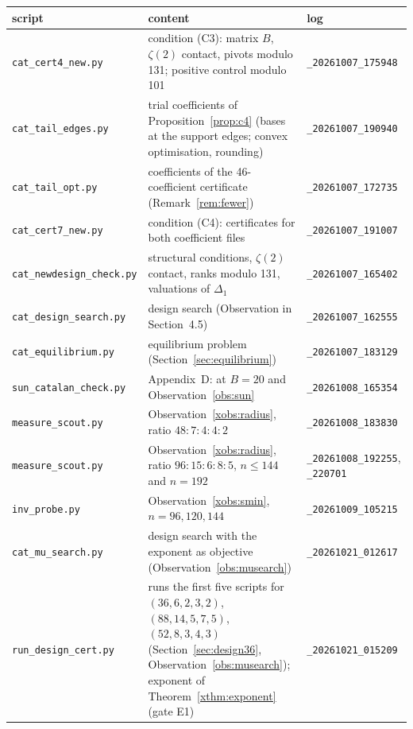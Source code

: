 \documentclass[11pt]{article}
\theoremstyle{definition}
\begin{document}
\begin{center}
\small
\begin{tabular}{p{4.2cm}p{7.2cm}p{3.6cm}}
\toprule
script & content & log\\
\midrule
\texttt{cat\_cert4\_new.py} & condition (C3): matrix $B$, $\zeta(2)$ contact, pivots modulo 131; positive control \cite[Table~1]{OAI} modulo 101 & \texttt{\_20261007\_175948}\\
\texttt{cat\_tail\_edges.py} & trial coefficients of Proposition~\ref{prop:c4} (bases at the support edges; convex optimisation, rounding) & \texttt{\_20261007\_190940}\\
\texttt{cat\_tail\_opt.py} & coefficients of the 46-coefficient certificate (Remark~\ref{rem:fewer}) & \texttt{\_20261007\_172735}\\
\texttt{cat\_cert7\_new.py} & condition (C4): certificates for both coefficient files & \texttt{\_20261007\_191007}\\
\texttt{cat\_newdesign\_check.py} & structural conditions, $\zeta(2)$ contact, ranks modulo 131, valuations of $\Delta_1$ & \texttt{\_20261007\_165402}\\
\texttt{cat\_design\_search.py} & design search (Observation in Section~4.5) & \texttt{\_20261007\_162555}\\
\texttt{cat\_equilibrium.py} & equilibrium problem (Section~\ref{sec:equilibrium}) & \texttt{\_20261007\_183129}\\
\texttt{sun\_catalan\_check.py} & Appendix~D: \cite[Proposition~3.1]{Sun} at $B=20$ and Observation~\ref{obs:sun} & \texttt{\_20261008\_165354}\\
\texttt{measure\_scout.py} & Observation~\ref{xobs:radius}, ratio $48:7:4:4:2$ & \texttt{\_20261008\_183830}\\
\texttt{measure\_scout.py} & Observation~\ref{xobs:radius}, ratio $96:15:6:8:5$, $n\le144$ and $n=192$ & \texttt{\_20261008\_192255}, \texttt{\_220701}\\
\texttt{inv\_probe.py} & Observation~\ref{xobs:smin}, $n=96,120,144$ & \texttt{\_20261009\_105215}\\
\texttt{cat\_mu\_search.py} & design search with the exponent as objective (Observation~\ref{obs:musearch}) & \texttt{\_20261021\_012617}\\
\texttt{run\_design\_cert.py} & runs the first five scripts for $(36,6,2,3,2)$, $(88,14,5,7,5)$, $(52,8,3,4,3)$ (Section~\ref{sec:design36}, Observation~\ref{obs:musearch}); exponent of Theorem~\ref{xthm:exponent} (gate E1) & \texttt{\_20261021\_015209}\\
\bottomrule
\end{tabular}
\end{center}
\end{document}
